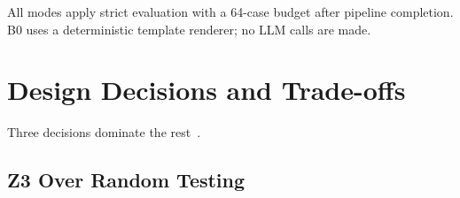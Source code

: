 \begin{table}[H]
  \caption{Execution mode configuration matrix.  Flags control which
           pipeline stages are active; numeric parameters tune per-stage
           behaviour.  All LLM-based modes use Qwen2.5-27B-Instruct (\textsf{Qwen-27B})
           with $K = 3$ unless noted.
           $N_{\max}$ is the per-scenario formal case cap.}
  \label{tab:impl-modes}
  \centering
  \par\smallskip
  \raggedright\footnotesize All modes apply strict evaluation with a
  64-case budget after pipeline completion.
  B0 uses a deterministic template renderer; no LLM calls are made.
\end{table}

\section{Design Decisions and Trade-offs}
\label{sec:impl:tradeoffs}

Three decisions dominate the rest~\citep{woodcock2009formalsurvey}.

\subsection{Z3 Over Random Testing}

